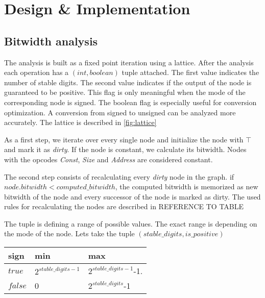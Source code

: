 \chapter{Design \& Implementation}\label{sec:impl}

\section{Bitwidth analysis}
The analysis is built as a fixed point iteration using a lattice. After the analysis each operation has a $(int,boolean)$ tuple attached. 
The first value indicates the number of stable digits. 
The second value indicates if the output of the node is guaranteed to be positive. 
This flag is only meaningful when the mode of the corresponding node is signed. 
The boolean flag is especially useful for conversion optimization. A conversion from signed to unsigned can be analyzed more accurately. 
The lattice is described in \ref{fig:lattice}


As a first step, we iterate over every single node and initialize the node with $\top$ and mark it as \textit{dirty}. If the node is constant, we calculate its bitwidth. Nodes with the opcodes \textit{Const}, \textit{Size} and \textit{Address} are considered constant.

The second step consists of recalculating every \textit{dirty} node in the graph. if $node.bitwidth < computed\_bitwidth$, the computed bitwidth is memorized as new bitwidth of the node and every successor of the node is marked as dirty. The used rules for recalculating the nodes are described in REFERENCE TO TABLE %

The tuple is defining a range of possible values. The exact range is depending on the mode of the node. Lets take the tuple $(stable\_digits,is\_positive)$
\begin{center}
	\begin{tabular}{| l | l | l |}
		\hline
		sign & min & max \\ \hline
		$true$ & $2^{stable\_digits-1}$ & $2^{stable\_digits-1}$-1. \\ \hline
		$false$ & 0 & $2^{stable\_digits}$-1 \\
		\hline
	\end{tabular}
\end{center}

